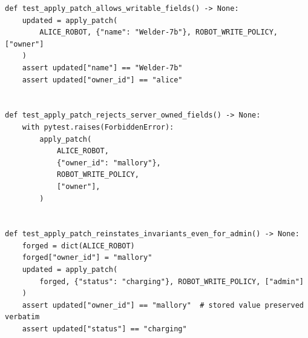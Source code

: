 \begin{verbatim}
def test_apply_patch_allows_writable_fields() -> None:
    updated = apply_patch(
        ALICE_ROBOT, {"name": "Welder-7b"}, ROBOT_WRITE_POLICY, ["owner"]
    )
    assert updated["name"] == "Welder-7b"
    assert updated["owner_id"] == "alice"


def test_apply_patch_rejects_server_owned_fields() -> None:
    with pytest.raises(ForbiddenError):
        apply_patch(
            ALICE_ROBOT,
            {"owner_id": "mallory"},
            ROBOT_WRITE_POLICY,
            ["owner"],
        )


def test_apply_patch_reinstates_invariants_even_for_admin() -> None:
    forged = dict(ALICE_ROBOT)
    forged["owner_id"] = "mallory"
    updated = apply_patch(
        forged, {"status": "charging"}, ROBOT_WRITE_POLICY, ["admin"]
    )
    assert updated["owner_id"] == "mallory"  # stored value preserved verbatim
    assert updated["status"] == "charging"
\end{verbatim}

